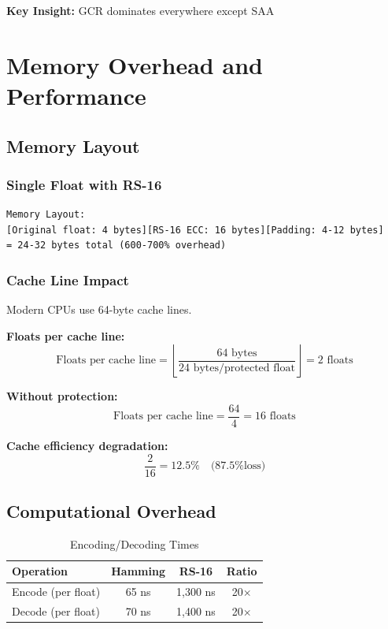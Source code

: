\documentclass[11pt,a4paper]{article}
\begin{document}
\textbf{Key Insight:} GCR dominates everywhere except SAA

\newpage
\section{Memory Overhead and Performance}

\subsection{Memory Layout}

\subsubsection{Single Float with RS-16}

\begin{verbatim}
Memory Layout:
[Original float: 4 bytes][RS-16 ECC: 16 bytes][Padding: 4-12 bytes]
= 24-32 bytes total (600-700% overhead)
\end{verbatim}

\subsubsection{Cache Line Impact}

Modern CPUs use 64-byte cache lines.

\textbf{Floats per cache line:}
\begin{equation}
\text{Floats per cache line} = \left\lfloor \frac{64 \text{ bytes}}{24 \text{ bytes/protected float}} \right\rfloor = 2 \text{ floats}
\end{equation}

\textbf{Without protection:}
\begin{equation}
\text{Floats per cache line} = \frac{64}{4} = 16 \text{ floats}
\end{equation}

\textbf{Cache efficiency degradation:}
\begin{equation}
\frac{2}{16} = 12.5\% \quad \text{(87.5\% loss)}
\end{equation}

\subsection{Computational Overhead}

\begin{table}[htbp]
\centering
\caption{Encoding/Decoding Times}
\begin{tabular}{@{}lccc@{}}
\toprule
\textbf{Operation} & \textbf{Hamming} & \textbf{RS-16} & \textbf{Ratio} \\ \midrule
Encode (per float) & 65 ns & 1,300 ns & 20$\times$ \\
Decode (per float) & 70 ns & 1,400 ns & 20$\times$ \\ \bottomrule
\end{tabular}
\end{table}
\end{document}
